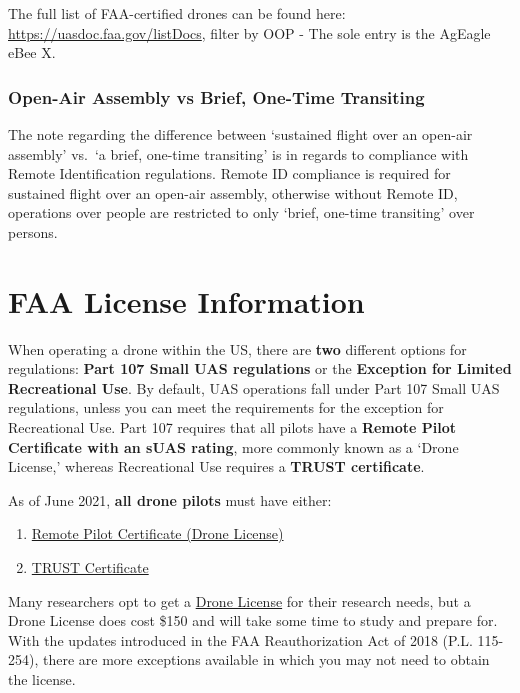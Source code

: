 \documentclass[
  12pt,
]{book}
\providecommand{\tightlist}{%
  \setlength{\itemsep}{0pt}\setlength{\parskip}{0pt}}
\begin{document}
The full list of FAA-certified drones can be found here: \url{https://uasdoc.faa.gov/listDocs}, filter by OOP - The sole entry is the AgEagle eBee X.

\hypertarget{open-air-assembly-vs-brief-one-time-transiting}{%
\subsection{Open-Air Assembly vs Brief, One-Time Transiting}\label{open-air-assembly-vs-brief-one-time-transiting}}

The note regarding the difference between `sustained flight over an open-air assembly' vs.~`a brief, one-time transiting' is in regards to compliance with Remote Identification regulations. Remote ID compliance is required for sustained flight over an open-air assembly, otherwise without Remote ID, operations over people are restricted to only `brief, one-time transiting' over persons.

\hypertarget{license}{%
\chapter{FAA License Information}\label{license}}

When operating a drone within the US, there are \textbf{two} different options for regulations: \textbf{Part 107 Small UAS regulations} or the \textbf{Exception for Limited Recreational Use}. By default, UAS operations fall under Part 107 Small UAS regulations, unless you can meet the requirements for the exception for Recreational Use. Part 107 requires that all pilots have a \textbf{Remote Pilot Certificate with an sUAS rating}, more commonly known as a `Drone License,' whereas Recreational Use requires a \textbf{TRUST certificate}.

As of June 2021, \textbf{all drone pilots} must have either:

\begin{enumerate}
\def\labelenumi{\arabic{enumi}.}
\tightlist
\item
  \protect\hyperlink{get-license}{Remote Pilot Certificate (Drone License)}
\item
  \protect\hyperlink{TRUST}{TRUST Certificate}
\end{enumerate}

Many researchers opt to get a \protect\hyperlink{get-license}{Drone License} for their research needs, but a Drone License does cost \$150 and will take some time to study and prepare for. With the updates introduced in the FAA Reauthorization Act of 2018 (P.L. 115-254), there are more exceptions available in which you may not need to obtain the license.
\end{document}
